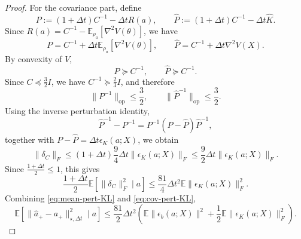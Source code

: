 \documentclass[11pt]{article}
\theoremstyle{plain}
\theoremstyle{definition}
\theoremstyle{remark}
\newcommand{\E}{\mathbb{E}}
\newcommand{\op}{\mathrm{op}}
\begin{document}
\begin{proof}
    For the covariance part, define
    \begin{equation*}
        P := (1+\Delta t)C^{-1}-\Delta t R(a),
        \qquad
        \widehat P := (1+\Delta t)C^{-1}-\Delta t\widehat K.
    \end{equation*}
    Since $R(a)=C^{-1}-\E_{\rho_a}[\nabla^2V(\theta)]$, we have
    \begin{equation*}
        P = C^{-1}+\Delta t\E_{\rho_a}[\nabla^2V(\theta)],
        \qquad
        \widehat P = C^{-1}+\Delta t\nabla^2V(X).
    \end{equation*}
    By convexity of $V$,
    \begin{equation*}
        P\succeq C^{-1}, \qquad \widehat P\succeq C^{-1}.
    \end{equation*}
    Since $C\preceq \frac{3}{2}I$, we have $C^{-1}\succeq \frac{2}{3}I$, and therefore
    \begin{equation*}
        \|P^{-1}\|_\op\leq \frac{3}{2},
        \qquad
        \|\widehat P^{-1}\|_\op\leq \frac{3}{2}.
    \end{equation*}
    Using the inverse perturbation identity,
    \begin{equation*}
        \widehat P^{-1}-P^{-1}
        =
        P^{-1}(P-\widehat P)\widehat P^{-1},
    \end{equation*}
    together with $P-\widehat P=\Delta t\epsilon_K(a;X)$, we obtain
    \begin{equation*}
        \|\delta_C\|_F
        \leq
        (1+\Delta t)\frac{9}{4}\Delta t\|\epsilon_K(a;X)\|_F
        \leq
        \frac{9}{2}\Delta t\|\epsilon_K(a;X)\|_F.
    \end{equation*}
    Since $\frac{1+\Delta t}{2}\leq 1$, this gives
    \begin{equation}\label{eq:cov-pert-KL}
        \frac{1+\Delta t}{2}\E[\|\delta_C\|_F^2\mid a]
        \leq
        \frac{81}{4}\Delta t^2
        \E\|\epsilon_K(a;X)\|_F^2.
    \end{equation}
    Combining \eqref{eq:mean-pert-KL} and \eqref{eq:cov-pert-KL},
    \begin{equation}\label{eq:delta-second-KL}
        \E[\|\widehat a_+-a_+\|_{\star,\Delta t}^2\mid a]
        \leq
        \frac{81}{2}\Delta t^2
        \left(
            \E\|\epsilon_b(a;X)\|^2
            +
            \frac{1}{2}\E\|\epsilon_K(a;X)\|_F^2
        \right).
    \end{equation}


\end{proof}
\end{document}
